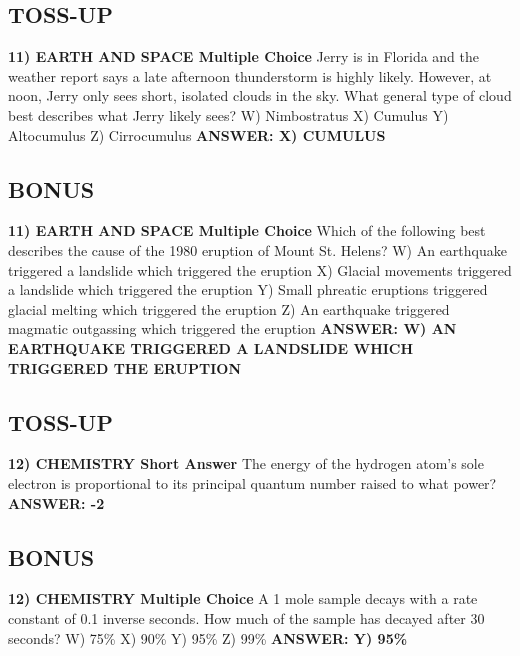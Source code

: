 \documentclass{article}
\begin{document}
\subsection*{TOSS-UP}
\textbf{11) EARTH AND SPACE Multiple Choice} Jerry is in Florida and the weather report says a late afternoon thunderstorm is highly likely. However, at noon, Jerry only sees short, isolated clouds in the sky. What general type of cloud best describes what Jerry likely sees?
\newline
W) Nimbostratus
\newline
X) Cumulus
\newline
Y) Altocumulus
\newline
Z) Cirrocumulus
\newline
\textbf{ANSWER: X) CUMULUS}

\subsection*{BONUS}
\textbf{11) EARTH AND SPACE Multiple Choice} Which of the following best describes the cause of the 1980 eruption of Mount St. Helens?
\newline
W) An earthquake triggered a landslide which triggered the eruption
\newline
X) Glacial movements triggered a landslide which triggered the eruption
\newline
Y) Small phreatic eruptions triggered glacial melting which triggered the eruption
\newline
Z) An earthquake triggered magmatic outgassing which triggered the eruption
\newline
\textbf{ANSWER: W) AN EARTHQUAKE TRIGGERED A LANDSLIDE WHICH TRIGGERED THE ERUPTION}

\subsection*{TOSS-UP}
\textbf{12) CHEMISTRY Short Answer} The energy of the hydrogen atom's sole electron is proportional to its principal quantum number raised to what power?
\newline
\textbf{ANSWER: -2}

\subsection*{BONUS}
\textbf{12) CHEMISTRY Multiple Choice} A 1 mole sample decays with a rate constant of 0.1 inverse seconds. How much of the sample has decayed after 30 seconds?
\newline
W) 75\%
\newline
X) 90\%
\newline
Y) 95\%
\newline
Z) 99\%
\newline
\textbf{ANSWER: Y) 95\%}
\end{document}
